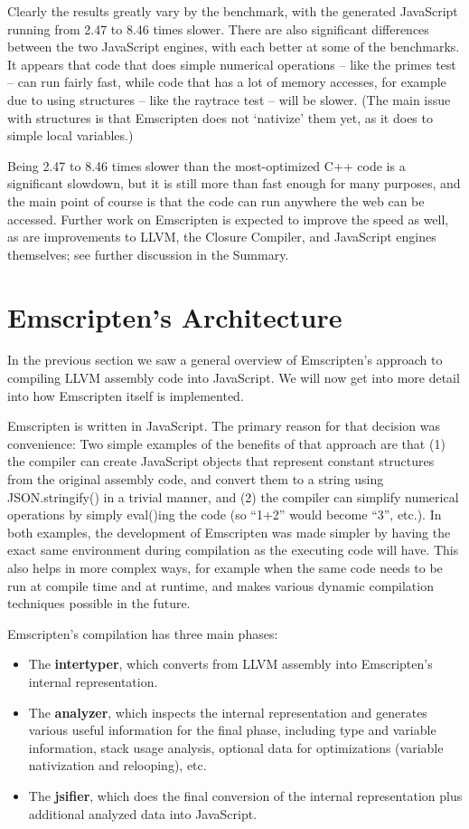 \documentclass[preprint,10pt]{sigplanconf}
\begin{document}
Clearly the results greatly vary by the benchmark, with the generated JavaScript running from 2.47 to 8.46 times
slower. There are also significant differences between the two JavaScript engines, with each better
at some of the benchmarks.
It appears that code that does simple numerical operations -- like
the primes test -- can run fairly fast, while code that has a lot of memory
accesses, for example due to using structures -- like the raytrace test --
will be slower. (The main issue with structures is that Emscripten does not
`nativize' them yet, as it does to simple local variables.)

Being 2.47 to 8.46 times slower than the most-optimized C++ code
is a significant slowdown, but it is still more than fast enough for
many purposes, and the main point of course is that the code can run
anywhere the web can be accessed. Further work on Emscripten is expected to
improve the speed as well, as are improvements to LLVM, the Closure
Compiler, and JavaScript engines themselves; see further discussion
in the Summary.

\section{Emscripten's Architecture}
\label{sec:emarch}

In the previous section we saw a general overview of Emscripten's approach
to compiling LLVM assembly code into JavaScript. We will now get into more detail
into how Emscripten itself is implemented.

Emscripten is written in JavaScript. The primary reason for that decision
was convenience: Two simple examples of the benefits of that approach are that (1)
the compiler can create JavaScript objects that represent constant structures from the original
assembly code, and convert them to a string using JSON.stringify()
in a trivial manner,
and (2) the compiler can simplify numerical operations by simply
eval()ing the code (so ``1+2'' would become ``3'', etc.). In both examples,
the development of Emscripten was made simpler by having the exact same environment
during compilation as the executing code will have. This also helps in more
complex ways, for example when the same code needs to be run at compile time
and at runtime, and makes various dynamic compilation techniques possible in the future.

Emscripten's compilation has three main phases:
\begin{itemize}
\item The \textbf{intertyper}, which converts from LLVM assembly into
      Emscripten's internal representation.
\item The \textbf{analyzer}, which inspects the internal representation
      and generates various useful information for the final phase,
      including type and variable information, stack usage analysis,
      optional data for optimizations
      (variable nativization and relooping), etc.
\item The \textbf{jsifier}, which does the final conversion of the
      internal representation plus additional analyzed data into JavaScript.
\end{itemize}
\end{document}
